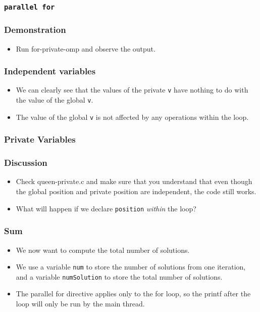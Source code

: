 \documentclass{beamer}
\begin{document}
\begin{frame}
\frametitle{\tt parallel for} 
\end{frame}

\begin{frame}
\frametitle{Demonstration}
\begin{itemize}
\item Run for-private-omp and observe the output.
\end{itemize}
\end{frame}

\begin{frame}
\frametitle{Independent variables}
\begin{itemize}
\item We can clearly see that the values of the private {\tt v} have
  nothing to do with the value of the global {\tt v}.
\item The value of the global {\tt v} is not affected by any
  operations within the loop.
\end{itemize}
\end{frame}

\begin{frame}
\frametitle{Private Variables}
\centerline{}
\end{frame}

\begin{frame}
\frametitle{Discussion}
\begin{itemize}
\item Check queen-private.c and make sure that you understand that
  even though the global position and private position are
  independent, the code still works.
\item What will happen if we declare {\tt position} {\em within} the
  loop?
\end{itemize}
\end{frame}



\begin{frame}
\frametitle{Sum}
\begin{itemize}
\item We now want to compute the total number of solutions.
\item We use a variable {\tt num} to store the number of solutions
  from one iteration, and a variable {\tt numSolution} to store the
  total number of solutions.
\item The parallel for directive applies only to the for loop, so the
  printf after the loop will only be run by the main thread.
\end{itemize}
\end{frame}
\end{document}

